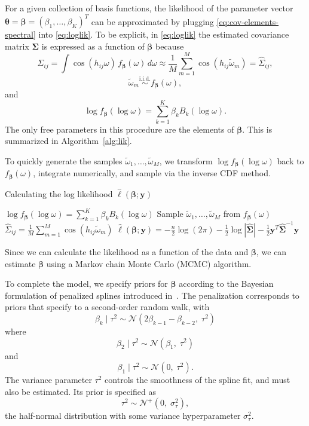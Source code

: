 \documentclass[12pt]{article}
\begin{document}
For a given collection of basis functions, the likelihood of the parameter vector $\bm{\theta} = \bm{\beta} = (\beta_1, \dots, \beta_K)^T$ can be approximated by plugging \eqref{eq:cov-elements-spectral} into \eqref{eq:loglik}. To be explicit, in \eqref{eq:loglik} the estimated covariance matrix $\bm{\Sigma}$ is expressed as a function of $\bm{\beta}$ because
\[
  \Sigma_{ij} = \int \cos(h_{ij}\omega) \, f_{\bm{\beta}}(\omega) \, d\omega \approx  \frac{1}{M} \sum_{m=1}^M \cos(h_{ij} \widetilde{\omega}_m) = \widehat{\Sigma}_{ij},
\]
\[
  \widetilde{\omega}_m \overset{\textrm{i.i.d.}}{\sim} f_{\bm{\beta}}(\omega),
\]
and
\[
  \log f_{\bm{\beta}}(\log \omega) = \sum_{k=1}^K \beta_k B_k(\log \omega).
\]
The only free parameters in this procedure are the elements of $\bm{\beta}$. This is summarized in Algorithm~\ref{alg:lik}.

To quickly generate the samples $\widetilde{\omega}_1, \ldots, \widetilde{\omega}_M$, we transform $\log f_{\bm{\beta}}(\log \omega)$ back to $f_{\bm{\beta}}(\omega)$, integrate numerically, and sample via the inverse CDF method.

\begin{algorithm}[!htb]
  \caption{\small Calculating the log likelihood $\hat{\ell}(\bm{\beta}; \bm{y})$} \label{alg:lik}
  \begin{algorithmic}[1]
    \State $\log f_{\bm{\beta}}(\log \omega) = \sum_{k=1}^K \beta_k B_k(\log \omega)$
    \State Sample $\widetilde{\omega}_1, \dots, \widetilde{\omega}_M$ from $f_{\bm{\beta}}(\omega)$
      \State $\widehat{\Sigma}_{ij} = \frac{1}{M} \sum_{m=1}^M \cos(h_{ij} \widetilde{\omega}_m)$
    \EndFor
    \State $\hat{\ell}(\bm{\beta}; \bm{y}) = -\frac{n}{2} \log(2\pi) - \frac{1}{2} \log |\widehat{\bm{\Sigma}}| - \frac{1}{2} \bm{y}^T \widehat{\bm{\Sigma}}^{-1} \bm{y}$
    \EndProcedure
  \end{algorithmic}
\end{algorithm}

Since we can calculate the likelihood as a function of the data and $\bm{\beta}$, we can estimate $\bm{\beta}$ using a Markov chain Monte Carlo (MCMC) algorithm. %

To complete the model, we specify priors for $\bm{\beta}$ according to the Bayesian formulation of penalized splines introduced in~\cite{lang2004bayesian}.  The penalization corresponds to priors that specify to a second-order random walk, with
\[
  \beta_k \;|\; \tau^2 \sim \mathcal{N}(2\beta_{k-1} - \beta_{k-2}, \; \tau^2)
\]
where
\[
  \beta_2 \;|\; \tau^2 \sim \mathcal{N}(\beta_1, \; \tau^2)
\]
and
\[
  \beta_1 \;|\; \tau^2 \sim \mathcal{N}(0, \; \tau^2).
\]
The variance parameter $\tau^2$ controls the smoothness of the spline fit, and must also be estimated. Its prior is specified as
\[
  \tau^2 \sim \mathcal{N}^+(0, \; \sigma^2_\tau),
\]
the half-normal distribution with some variance hyperparameter $\sigma^2_\tau$.
\end{document}
